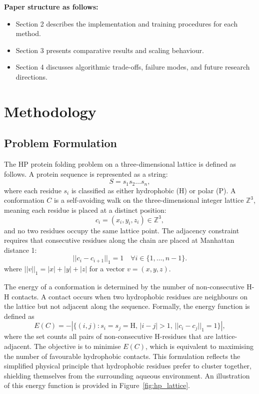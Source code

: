 \documentclass{article}
\theoremstyle{plain}
\theoremstyle{definition}
\begin{document}
\textbf{Paper structure as follows:}
\begin{itemize}[nosep]
    \item Section 2 describes the implementation and training procedures for each method.
    \item Section 3 presents comparative results and scaling behaviour.
    \item Section 4 discusses algorithmic trade-offs, failure modes, and future research directions.
\end{itemize}

\section{Methodology}

\subsection{Problem Formulation}

The HP protein folding problem on a three-dimensional lattice is defined as follows. A protein sequence is represented as a string:
\begin{equation}
S = s_1 s_2 \ldots s_n,
\end{equation}
where each residue $s_i$ is classified as either hydrophobic (H) or polar (P). A conformation $C$ is a self-avoiding walk on the three-dimensional integer lattice $\mathbb{Z}^3$, meaning each residue is placed at a distinct position:
\begin{equation}
c_i = (x_i, y_i, z_i) \in \mathbb{Z}^3,
\end{equation}
and no two residues occupy the same lattice point. The adjacency constraint requires that consecutive residues along the chain are placed at Manhattan distance 1:
\begin{equation}
||c_i - c_{i+1}||_1 = 1 \quad \forall i \in \{1, \ldots, n-1\}.
\end{equation}
where $||v||_1 = |x| + |y| + |z|$ for a vector $v = (x, y, z)$.

The energy of a conformation is determined by the number of non-consecutive H-H contacts. A contact occurs when two hydrophobic residues are neighbours on the lattice but not adjacent along the sequence. Formally, the energy function is defined as
\begin{equation}
E(C) = -\left|\{(i,j) : s_i = s_j = \text{H}, \, |i - j| > 1, \, ||c_i - c_j||_1 = 1\}\right|,
\end{equation}
where the set counts all pairs of non-consecutive H-residues that are lattice-adjacent. The objective is to minimise $E(C)$, which is equivalent to maximising the number of favourable hydrophobic contacts. This formulation reflects the simplified physical principle that hydrophobic residues prefer to cluster together, shielding themselves from the surrounding aqueous environment. An illustration of this energy function is provided in Figure~\ref{fig:hp_lattice}.
\end{document}
